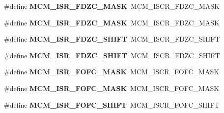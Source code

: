 \begin{DoxyCompactItemize}
\item 
\#define {\bfseries M\+C\+M\+\_\+\+I\+S\+R\+\_\+\+F\+D\+Z\+C\+\_\+\+M\+A\+SK}~M\+C\+M\+\_\+\+I\+S\+C\+R\+\_\+\+F\+D\+Z\+C\+\_\+\+M\+A\+SK\hypertarget{group__Backward__Compatibility__Symbols_ga610f581ddc6b9cc1e4b4847a99509a08}{}\label{group__Backward__Compatibility__Symbols_ga610f581ddc6b9cc1e4b4847a99509a08}

\item 
\#define {\bfseries M\+C\+M\+\_\+\+I\+S\+R\+\_\+\+F\+D\+Z\+C\+\_\+\+M\+A\+SK}~M\+C\+M\+\_\+\+I\+S\+C\+R\+\_\+\+F\+D\+Z\+C\+\_\+\+M\+A\+SK\hypertarget{group__Backward__Compatibility__Symbols_ga610f581ddc6b9cc1e4b4847a99509a08}{}\label{group__Backward__Compatibility__Symbols_ga610f581ddc6b9cc1e4b4847a99509a08}

\item 
\#define {\bfseries M\+C\+M\+\_\+\+I\+S\+R\+\_\+\+F\+D\+Z\+C\+\_\+\+S\+H\+I\+FT}~M\+C\+M\+\_\+\+I\+S\+C\+R\+\_\+\+F\+D\+Z\+C\+\_\+\+S\+H\+I\+FT\hypertarget{group__Backward__Compatibility__Symbols_ga3fbed1f99af0d0916feebea373cfbb8b}{}\label{group__Backward__Compatibility__Symbols_ga3fbed1f99af0d0916feebea373cfbb8b}

\item 
\#define {\bfseries M\+C\+M\+\_\+\+I\+S\+R\+\_\+\+F\+D\+Z\+C\+\_\+\+S\+H\+I\+FT}~M\+C\+M\+\_\+\+I\+S\+C\+R\+\_\+\+F\+D\+Z\+C\+\_\+\+S\+H\+I\+FT\hypertarget{group__Backward__Compatibility__Symbols_ga3fbed1f99af0d0916feebea373cfbb8b}{}\label{group__Backward__Compatibility__Symbols_ga3fbed1f99af0d0916feebea373cfbb8b}

\item 
\#define {\bfseries M\+C\+M\+\_\+\+I\+S\+R\+\_\+\+F\+O\+F\+C\+\_\+\+M\+A\+SK}~M\+C\+M\+\_\+\+I\+S\+C\+R\+\_\+\+F\+O\+F\+C\+\_\+\+M\+A\+SK\hypertarget{group__Backward__Compatibility__Symbols_ga90b5519e0a496915707fc7c62a13a70a}{}\label{group__Backward__Compatibility__Symbols_ga90b5519e0a496915707fc7c62a13a70a}

\item 
\#define {\bfseries M\+C\+M\+\_\+\+I\+S\+R\+\_\+\+F\+O\+F\+C\+\_\+\+M\+A\+SK}~M\+C\+M\+\_\+\+I\+S\+C\+R\+\_\+\+F\+O\+F\+C\+\_\+\+M\+A\+SK\hypertarget{group__Backward__Compatibility__Symbols_ga90b5519e0a496915707fc7c62a13a70a}{}\label{group__Backward__Compatibility__Symbols_ga90b5519e0a496915707fc7c62a13a70a}

\item 
\#define {\bfseries M\+C\+M\+\_\+\+I\+S\+R\+\_\+\+F\+O\+F\+C\+\_\+\+S\+H\+I\+FT}~M\+C\+M\+\_\+\+I\+S\+C\+R\+\_\+\+F\+O\+F\+C\+\_\+\+S\+H\+I\+FT\hypertarget{group__Backward__Compatibility__Symbols_ga2140808617bd0d532f24a58a16eb87d7}{}\label{group__Backward__Compatibility__Symbols_ga2140808617bd0d532f24a58a16eb87d7}


\end{DoxyCompactItemize}
